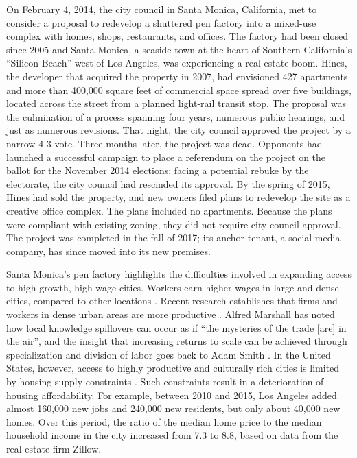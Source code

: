 \documentclass[article,11pt]{memoir}
\begin{document}
On February 4, 2014, the city council in Santa Monica, California, met to consider a proposal to redevelop a shuttered pen factory into a mixed-use complex with homes, shops, restaurants, and offices. The factory had been closed since 2005 and Santa Monica, a seaside town at the heart of Southern California's ``Silicon Beach'' west of Los Angeles, was experiencing a real estate boom.  Hines, the developer that acquired the property in 2007, had envisioned 427 apartments and more than 400,000 square feet of commercial space spread over five buildings, located across the street from a planned light-rail transit stop.  The proposal was the culmination of a process spanning four years, numerous public hearings, and just as numerous revisions.  That night, the city council approved the project by a narrow 4-3 vote.  Three months later, the project was dead. Opponents had launched a successful campaign to place a referendum on the project on the ballot for the November 2014 elections; facing a potential rebuke by the electorate, the city council had rescinded its approval.  By the spring of 2015, Hines had sold the property, and new owners filed plans to redevelop the site as a creative office complex.  The plans included no apartments.  Because the plans were compliant with existing zoning, they did not require city council approval.  The project was completed in the fall of 2017; its anchor tenant, a social media company, has since moved into its new premises.

Santa Monica's pen factory highlights the difficulties involved in expanding access to high-growth, high-wage cities. Workers earn higher wages in large and dense cities, compared to other locations \citep[and references therein]{rosenthal_chapter_2004}.  Recent research establishes that firms and workers in dense urban areas are more productive \citep{puga_magnitude_2010}.  Alfred Marshall has noted how local knowledge spillovers can occur as if ``the mysteries of the trade [are] in the air'', and the insight that increasing returns to scale can be achieved through specialization and division of labor goes back to Adam Smith \citep{marshall_principles_1920,smith_inquiry_1776}.  In the United States, however, access to highly productive and culturally rich cities is limited by housing supply constraints \citep{hsieh_housing_2017}.  Such constraints result in a deterioration of housing affordability.  For example, between 2010 and 2015, Los Angeles added almost 160,000 new jobs and 240,000 new residents, but only about 40,000 new homes.  Over this period, the ratio of the median home price to the median household income in the city increased from 7.3 to 8.8, based on data from the real estate firm Zillow.
\end{document}
